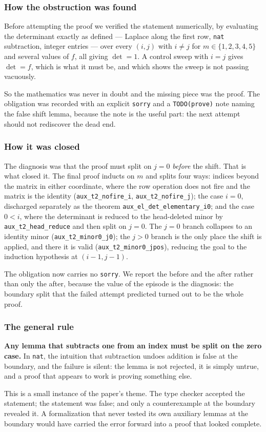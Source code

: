 \subsubsection{How the obstruction was found}

Before attempting the proof we verified the statement numerically, by evaluating
the determinant exactly as defined --- Laplace along the first row,
\texttt{nat} subtraction, integer entries --- over every $(i,j)$ with
$i \neq j$ for $m \in \{1,2,3,4,5\}$ and several values of $f$, all giving $\det = 1$. A control sweep with $i = j$ gives $\det = f$,
which is what it must be, and which shows the sweep is not passing vacuously.

So the mathematics was never in doubt and the missing piece was the proof. The
obligation was recorded with an explicit \texttt{sorry} and a \texttt{TODO(prove)}
note naming the false shift lemma, because the note is the useful part: the next
attempt should not rediscover the dead end.

\subsubsection{How it was closed}

The diagnosis was that the proof must split on $j = 0$ \emph{before} the shift.
That is what closed it. The final proof inducts on $m$ and splits four ways:
indices beyond the matrix in either coordinate, where the row operation does not
fire and the matrix is the identity (\texttt{aux\_t2\_nofire\_i},
\texttt{aux\_t2\_nofire\_j}); the case $i = 0$, discharged separately as the
theorem \texttt{aux\_el\_det\_elementary\_i0}; and the case $0 < i$, where the
determinant is reduced to the head-deleted minor by
\texttt{aux\_t2\_head\_reduce} and then split on $j = 0$. The $j = 0$ branch
collapses to an identity minor (\texttt{aux\_t2\_minor0\_j0}); the $j > 0$ branch
is the only place the shift is applied, and there it is valid
(\texttt{aux\_t2\_minor0\_jpos}), reducing the goal to the induction hypothesis
at $(i-1, j-1)$.

The obligation now carries no \texttt{sorry}. We report the before and the after
rather than only the after, because the value of the episode is the diagnosis:
the boundary split that the failed attempt predicted turned out to be the whole
proof.

\subsubsection{The general rule}

\textbf{Any lemma that subtracts one from an index must be split on the zero
case.} In \texttt{nat}, the intuition that subtraction undoes addition is
false at the boundary, and the failure is silent: the lemma is not rejected, it
is simply untrue, and a proof that appears to work is proving something else.

This is a small instance of the paper's theme. The type checker accepted the
statement; the statement was false; and only a counterexample at the boundary
revealed it. A formalization that never tested its own auxiliary lemmas at the
boundary would have carried the error forward into a proof that looked complete.
